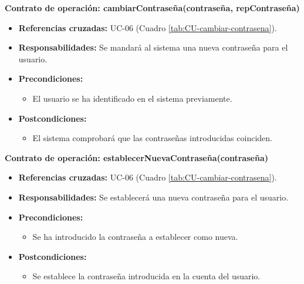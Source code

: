 \textbf{Contrato de operación: cambiarContraseña(contraseña, repContraseña)}
\begin{itemize}
\item \textbf{Referencias cruzadas:} UC-06 (Cuadro \ref{tab:CU-cambiar-contrasena}).
\item \textbf{Responsabilidades:} Se mandará al sistema una nueva contraseña para el usuario.
\item \textbf{Precondiciones:} 
 \begin{itemize}
\item El usuario se ha identificado en el sistema previamente.
\end {itemize}
\item \textbf{Postcondiciones:} 
 \begin{itemize}
\item El sistema comprobará que las contraseñas introducidas coinciden.
\end {itemize}
\end {itemize}

\textbf{Contrato de operación: establecerNuevaContraseña(contraseña)}
\begin{itemize}
\item \textbf{Referencias cruzadas:} UC-06 (Cuadro \ref{tab:CU-cambiar-contrasena}).
\item \textbf{Responsabilidades:} Se establecerá una nueva contraseña para el usuario.
\item \textbf{Precondiciones:} 
 \begin{itemize}
\item Se ha introducido la contraseña a establecer como nueva.
\end {itemize}
\item \textbf{Postcondiciones:} 
 \begin{itemize}
\item Se establece la contraseña introducida en la cuenta del usuario.
\end {itemize}
\end {itemize}


\vspace{10mm}

